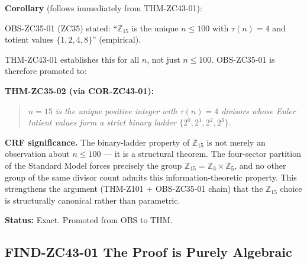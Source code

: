 \documentclass[12pt, a4paper]{article}
\begin{document}

\begin{derivedbox}[title={COR-ZC43-01: OBS-ZC35-01 Promoted
  to THM-ZC35-02 (Exact)}]
\textbf{Corollary} (follows immediately from THM-ZC43-01):

OBS-ZC35-01 (ZC35) stated: ``$\mathbb{Z}_{15}$ is the unique
$n \leq 100$ with $\tau(n) = 4$ and totient values
$\{1, 2, 4, 8\}$'' (empirical).

THM-ZC43-01 establishes this for all $n$, not just $n \leq 100$.
OBS-ZC35-01 is therefore promoted to:

\medskip
\textbf{THM-ZC35-02 (via COR-ZC43-01):}
\begin{quote}
\textit{$n = 15$ is the unique positive integer with
$\tau(n) = 4$ divisors whose Euler totient values form a strict
binary ladder $\{2^0, 2^1, 2^2, 2^3\}$.}
\end{quote}

\textbf{CRF significance.}
The binary-ladder property of $\mathbb{Z}_{15}$ is not merely
an observation about $n \leq 100$ --- it is a structural theorem.
The four-sector partition of the Standard Model forces precisely
the group $\mathbb{Z}_{15} = \mathbb{Z}_3 \times \mathbb{Z}_5$,
and no other group of the same divisor count admits this
information-theoretic property. This strengthens the argument
(THM-Z101 + OBS-ZC35-01 chain) that the $\mathbb{Z}_{15}$
choice is structurally canonical rather than parametric.

\textbf{Status:} Exact. Promoted from OBS to THM.
\end{derivedbox}

\subsection{FIND-ZC43-01 \quad The Proof is Purely Algebraic}

\end{document}
